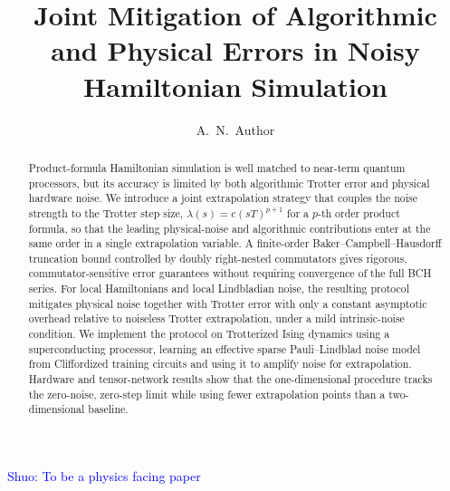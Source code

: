 \documentclass[aps,pra,reprint,superscriptaddress]{revtex4-2}
\newcommand{\sz}[1]{\textcolor{blue}{Shuo: #1}}
\begin{document}
\makeatletter
\long{}
\makeatother

\title{Joint Mitigation of Algorithmic and Physical Errors in Noisy Hamiltonian Simulation}
\author{A.~N.~Author}
\date{}

\begin{abstract}
Product-formula Hamiltonian simulation is well matched to near-term quantum processors, but its accuracy is limited by both algorithmic Trotter error and physical hardware noise. We introduce a joint extrapolation strategy that couples the noise strength to the Trotter step size, $\lambda(s)=c(sT)^{p+1}$ for a $p$-th order product formula, so that the leading physical-noise and algorithmic contributions enter at the same order in a single extrapolation variable. A finite-order Baker--Campbell--Hausdorff truncation bound controlled by doubly right-nested commutators gives rigorous, commutator-sensitive error guarantees without requiring convergence of the full BCH series. For local Hamiltonians and local Lindbladian noise, the resulting protocol mitigates physical noise together with Trotter error with only a constant asymptotic overhead relative to noiseless Trotter extrapolation, under a mild intrinsic-noise condition. We implement the protocol on Trotterized Ising dynamics using a superconducting processor, learning an effective sparse Pauli--Lindblad noise model from Cliffordized training circuits and using it to amplify noise for extrapolation. Hardware and tensor-network results show that the one-dimensional procedure tracks the zero-noise, zero-step limit while using fewer extrapolation points than a two-dimensional baseline.
\end{abstract}

\maketitle

\sz{To be a physics facing paper}
\end{document}
